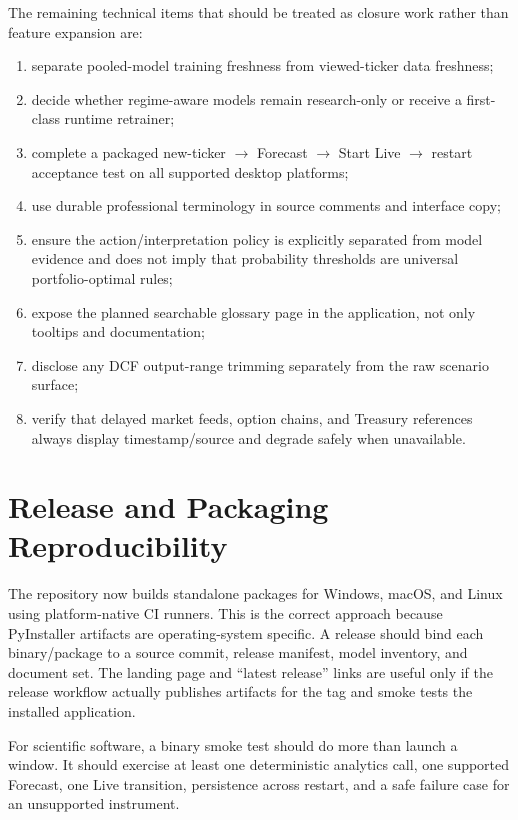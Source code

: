 \documentclass[11pt]{article}
\begin{document}
The remaining technical items that should be treated as closure work rather than feature expansion are:
\begin{enumerate}[itemsep=0.3em]
\item separate pooled-model training freshness from viewed-ticker data freshness;
\item decide whether regime-aware models remain research-only or receive a first-class runtime retrainer;
\item complete a packaged new-ticker $\rightarrow$ Forecast $\rightarrow$ Start Live $\rightarrow$ restart acceptance test on all supported desktop platforms;
\item use durable professional terminology in source comments and interface copy;
\item ensure the action/interpretation policy is explicitly separated from model evidence and does not imply that probability thresholds are universal portfolio-optimal rules;
\item expose the planned searchable glossary page in the application, not only tooltips and documentation;
\item disclose any DCF output-range trimming separately from the raw scenario surface;
\item verify that delayed market feeds, option chains, and Treasury references always display timestamp/source and degrade safely when unavailable.
\end{enumerate}

\section{Release and Packaging Reproducibility}
The repository now builds standalone packages for Windows, macOS, and Linux using platform-native CI runners. This is the correct approach because PyInstaller artifacts are operating-system specific. A release should bind each binary/package to a source commit, release manifest, model inventory, and document set. The landing page and ``latest release'' links are useful only if the release workflow actually publishes artifacts for the tag and smoke tests the installed application.

For scientific software, a binary smoke test should do more than launch a window. It should exercise at least one deterministic analytics call, one supported Forecast, one Live transition, persistence across restart, and a safe failure case for an unsupported instrument.
\end{document}
